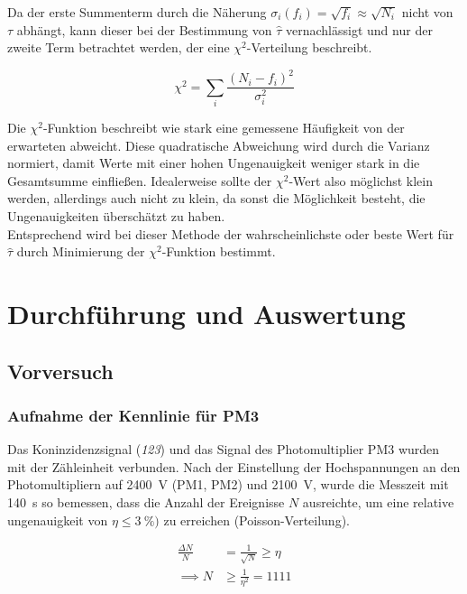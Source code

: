 \documentclass[slug=LM, room=Andreas-Schubert-Bau\,\ K\ 1A, supervisor=Anne-Sophie\ Berthold, coursedate=13.\ 12.\ 2019]{../../Lab_Report_LaTeX/lab_report}
\begin{document}
Da der erste Summenterm durch die Näherung \(\sigma_i(f_i) = \sqrt{f_i} \approx \sqrt{N_i}\) nicht
von \(\tau\) abhängt, kann dieser bei der Bestimmung von \(\hat{\tau}\) vernachlässigt und nur
der zweite Term betrachtet werden, der eine \(\chi^2\)-Verteilung beschreibt.

\begin{equation}\label{eq:chi}
 \chi^2 = \sum_{i} \frac{(N_i - f_i)^2}{\sigma_i^2}
\end{equation}

Die \(\chi^2\)-Funktion beschreibt wie stark eine gemessene Häufigkeit von der erwarteten abweicht.
Diese quadratische Abweichung wird durch die Varianz normiert, damit Werte mit einer hohen
Ungenauigkeit weniger stark in die Gesamtsumme einfließen. Idealerweise sollte der \(\chi^2\)-Wert
also möglichst klein werden, allerdings auch nicht zu klein, da sonst die Möglichkeit besteht, die
Ungenauigkeiten überschätzt zu haben.\\

Entsprechend wird bei dieser Methode der wahrscheinlichste oder beste Wert für \(\hat\tau\) durch
Minimierung der \(\chi^2\)-Funktion bestimmt.

\section{Durchf\"uhrung und Auswertung}
\label{sec:durchaus}

\subsection{Vorversuch}
\label{sec:vorvers}
\subsubsection{Aufnahme der Kennlinie f\"ur PM3}
\label{sec:pm3kenn}

Das Koninzidenzsignal (\textit{123}) und das Signal des
Photomultiplier PM3 wurden mit der Z\"ahleinheit verbunden.  Nach der
Einstellung der Hochspannungen an den Photomultipliern auf
\SI{2400}{\volt} (PM1, PM2) und \SI{2100}{\volt}, wurde die Messzeit
mit \SI{140}{\second} so bemessen, dass die Anzahl der Ereignisse
\(N\) ausreichte, um eine relative ungenauigkeit von
\(\eta \leq \SI{3}{\percent})\) zu erreichen (Poisson-Verteilung).

\begin{align}
  \label{eq:mtime}
  \frac{\Delta N}{N} &= \frac{1}{\sqrt{N}} \geq \eta \\
  \implies N &\geq \frac{1}{\eta^2} = 1111
\end{align}
\end{document}
